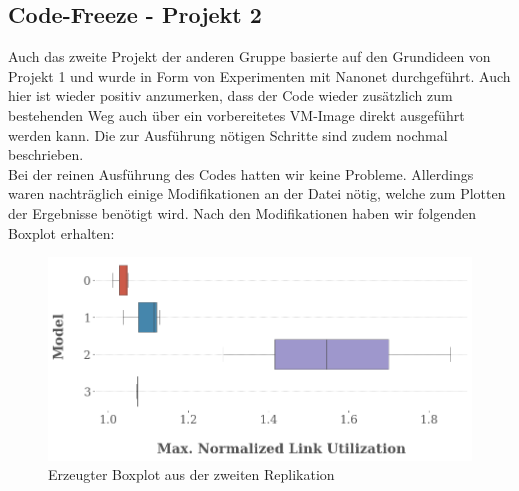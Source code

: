 \documentclass[sigconf,noacm,review]{acmart}
\begin{document}
\subsection{Code-Freeze - Projekt 2}
Auch das zweite Projekt der anderen Gruppe basierte auf den Grundideen von Projekt 1 und wurde in Form von Experimenten mit Nanonet durchgeführt. Auch hier ist wieder positiv anzumerken, dass der Code wieder zusätzlich zum bestehenden Weg auch über ein vorbereitetes VM-Image direkt ausgeführt werden kann. Die zur Ausführung nötigen Schritte sind zudem nochmal beschrieben. \\
Bei der reinen Ausführung des Codes hatten wir keine Probleme. Allerdings waren nachträglich einige Modifikationen an der Datei nötig, welche zum Plotten der Ergebnisse benötigt wird. Nach den Modifikationen haben wir folgenden Boxplot erhalten:
\begin{figure}[h]
  \centering
  \includegraphics[width=\linewidth]{abbildungen/boxplot}
  \caption{Erzeugter Boxplot aus der zweiten Replikation}
\end{figure}








\appendix

\end{document}
